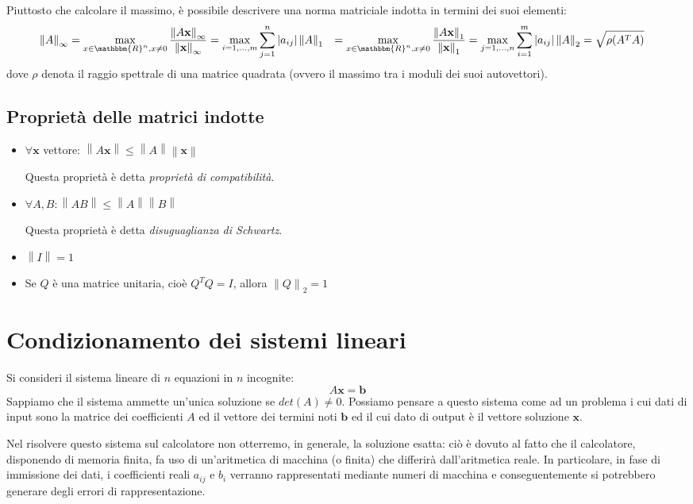 \documentclass[12pt]{report}
\begin{document}
Piuttosto che calcolare il massimo, è possibile descrivere una norma matriciale indotta in termini dei suoi elementi:
\begin{align*}
	\left\|A\right\|_\infty &= \max_{x\in\mathbbm{R}^n, x\neq 0} \dfrac{\left\|A\mathbf{x}\right\|_\infty}{\left\|\mathbf{x}\right\|_\infty} = \max_{i=1,\dots, m}\displaystyle\sum_{j=1}^{n}\left| a_{ij}\right|
 	\left\|A\right\|_1 &= \max_{x\in\mathbbm{R}^n, x\neq 0} \dfrac{\left\|A\mathbf{x}\right\|_1}{\left\|\mathbf{x}\right\|_1} = \max_{j=1, \dots, n}\displaystyle\sum_{i=1}^{m}\left| a_{ij} \right|
	\left\|A\right\|_2 &= \sqrt{\rho(A^TA)}
\end{align*}
dove $\rho$ denota il raggio spettrale di una matrice quadrata (ovvero il massimo tra i moduli dei suoi autovettori).

\subsection{Proprietà delle matrici indotte}
\begin{itemize}
	\item $\forall \mathbf{x}$ vettore: $\left\| A\mathbf{x}\right\| \leq \left\|A\right\|\left\|\mathbf{x}\right\|$

	Questa proprietà è detta \textit{proprietà di compatibilità}.
	\item $\forall A, B: \left\|AB\right\| \leq \left\|A\right\|\left\|B\right\|$

	Questa proprietà è detta \textit{disuguaglianza di Schwartz}.
	\item $\left\|I\right\| = 1$
	\item Se $Q$ è una matrice unitaria, cioè $Q^TQ = I$, allora $\left\|Q\right\|_2 = 1$
\end{itemize}
\section{Condizionamento dei sistemi lineari}
Si consideri il sistema lineare di $n$ equazioni in $n$ incognite:
\[
A\mathbf{x} = \mathbf{b}
\]
Sappiamo che il sistema ammette un'unica soluzione se $det(A) \neq 0$. Possiamo pensare a questo sistema come ad un problema i cui dati di input sono la matrice dei coefficienti $A$ ed il vettore dei termini noti $\mathbf{b}$ ed il cui dato di output è il vettore soluzione $\mathbf{x}$.

Nel risolvere questo sistema sul calcolatore non otterremo, in generale, la soluzione esatta: ciò è dovuto al fatto che il calcolatore, disponendo di memoria finita, fa uso di un'aritmetica di macchina (o finita) che differirà dall'aritmetica reale. In particolare, in fase di immissione dei dati, i coefficienti reali $a_{ij}$ e $b_i$ verranno rappresentati mediante numeri di macchina e conseguentemente si potrebbero generare degli errori di rappresentazione.
\end{document}
